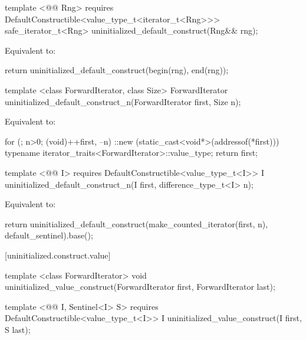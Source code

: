 {\color{addclr}
\begin{codeblock}
template <@@ Rng>
  requires
DefaultConstructible<value_type_t<iterator_t<Rng>>>
  safe_iterator_t<Rng> uninitialized_default_construct(Rng&& rng);
\end{codeblock}

\pnum
\effects Equivalent to:
\begin{codeblock}
        return uninitialized_default_construct(begin(rng), end(rng));
\end{codeblock}
} %

{\color{remclr}
\begin{codeblock}
template <class ForwardIterator, class Size>
  ForwardIterator uninitialized_default_construct_n(ForwardIterator first, Size n);
\end{codeblock}

\setcounter{Paras}{1}
\pnum
\effects Equivalent to:
\begin{codeblock}
        for (; n>0; (void)++first, --n)
          ::new (static_cast<void*>(addressof(*first)))
            typename iterator_traits<ForwardIterator>::value_type;
        return first;
\end{codeblock}
} %

{\color{addclr}

\begin{codeblock}
template <@@ I>
  requires
DefaultConstructible<value_type_t<I>>
  I uninitialized_default_construct_n(I first, difference_type_t<I> n);
\end{codeblock}

\pnum
\effects Equivalent to:
\begin{codeblock}
    return uninitialized_default_construct(make_counted_iterator(first, n),
      default_sentinel{}).base();
\end{codeblock}
} %

[uninitialized.construct.value]{}
{\color{remclr}
\begin{codeblock}
template <class ForwardIterator>
  void uninitialized_value_construct(ForwardIterator first, ForwardIterator last);
\end{codeblock}
} %
{\color{addclr}
\begin{codeblock}
template <@@ I, Sentinel<I> S>
  requires
DefaultConstructible<value_type_t<I>>
  I uninitialized_value_construct(I first, S last);
\end{codeblock}
} %


